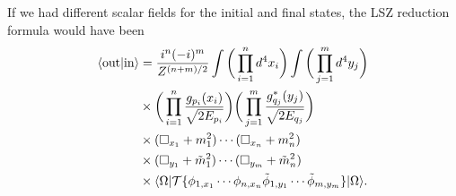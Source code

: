 \begin{obs}
    If we had different scalar fields for the initial and final states, the LSZ reduction formula would have been 
    \begin{equation}
    \begin{split}
        \langle \mathrm{out} | \mathrm{in} \rangle &= \frac{i^{n}(-i)^m}{Z^{(n + m)/2}}\int\bigg(\prod_{i=1}^n d^4x_i\bigg)\int\bigg(\prod_{j=1}^m d^4y_j\bigg) \\
        &\times \bigg(\prod_{i=1}^n \frac{g_{p_i}(x_i)}{\sqrt{2E_{p_i}}}\bigg)\bigg(\prod_{j=1}^m \frac{g_{q_j}^*(y_j)}{\sqrt{2E_{q_j}}}\bigg) \\
        &\times (\square_{x_1} + m_1^2)\cdots(\square_{x_n} + m_n^2) \\
        &\times (\square_{y_1} + \tilde{m}^2_1)\cdots(\square_{y_m} + \tilde{m}^2_n) \\
        &\times \langle \Omega | \mathcal{T}{\{\phi_{1,x_1}\cdots\phi_{n,x_n}\tilde{\phi}_{1,y_1}\cdots\tilde{\phi}_{m,y_m}\}} | \Omega \rangle.
    \end{split}
\end{equation}
\end{obs}

